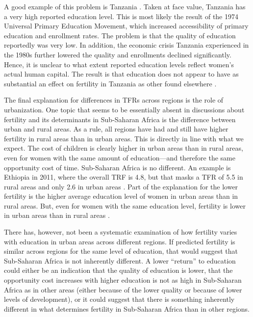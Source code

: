 \documentclass[letterpaper,12pt]{article}
\begin{document}
A good example of this problem is Tanzania
\citep{Galabawa2001,Wedgwood2005}.
Taken at face value, Tanzania has a very high reported education level.
This is most likely the result of the 1974 Universal Primary Education
Movement, which increased accessibility of primary education and
enrollment rates.
The problem is that the quality of education reportedly was very low.
In addition, the economic crisis Tanzania experienced in the 1980s
further lowered the quality and enrollments declined significantly.
Hence, it is unclear to what extent reported education levels reflect
women's actual human capital.
The result is that education does not appear to have as substantial an
effect on fertility in Tanzania as other found elsewhere
\citep{Alam2016}.

The final explanation for differences in TFRs across regions is the role
of urbanization.
One topic that seems to be essentially absent in discussions about
fertility and its determinants in Sub-Saharan Africa is the difference
between urban and rural areas.
As a rule, all regions have had and still have higher fertility in rural
areas than in urban areas.
This is directly in line with what we expect.
The cost of children is clearly higher in urban areas than in rural
areas, even for women with the same amount of education---and therefore
the same opportunity cost of time.
Sub-Saharan Africa is no different.
An example is Ethiopia in 2011, where the overall TRF is 4.8, but that
masks a TFR of 5.5 in rural areas and only 2.6 in urban areas
\citep{Central-Statistical-Agency/Ethiopia2012}.
Part of the explanation for the lower fertility is the higher average
education level of women in urban areas than in rural areas.
But, even for women with the same education level, fertility is lower in
urban areas than in rural areas \citep{Ainsworth1996}.

There has, however, not been a systematic examination of how fertility
varies with education in urban areas across different regions.
If predicted fertility is similar across regions for the same level of
education, that would suggest that Sub-Saharan Africa is not inherently
different.
A lower ``return'' to education could either be an indication that the
quality of education is lower, that the opportunity cost increases with
higher education is not as high in Sub-Saharan Africa as in other areas
(either because of the lower quality or because of lower levels of
development), or it could suggest that there is something inherently
different in what determines fertility in Sub-Saharan Africa than in
other regions.
\end{document}
